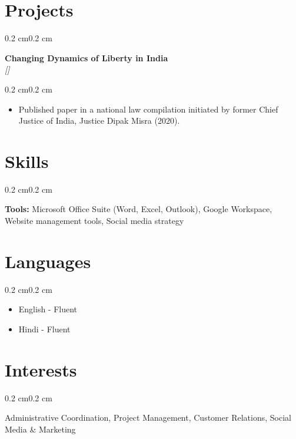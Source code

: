 \documentclass[10pt, letterpaper]{article}
\newenvironment{highlights}{%
    \begin{itemize}[
        topsep=0.10 cm,%
        parsep=0.10 cm,%
        partopsep=0pt,%
        itemsep=0pt,%
        leftmargin=0.4 cm + 10pt%
    ]
}{%
    \end{itemize}%
}
\newenvironment{onecolentry}{%
    \begin{adjustwidth}{0.2 cm}{0.2 cm}%
}{%
    \end{adjustwidth}%
}
\newenvironment{twocolentry}[1]{%
    \begin{onecolentry}%
    \def\twocolentryarg{#1}%
    \noindent
    \begin{minipage}[t]{0.68\textwidth} %
}{%
    \end{minipage}\hfill%
    \begin{minipage}[t]{0.30\textwidth} %
      \raggedleft\twocolentryarg
    \end{minipage}%
    \vspace{0.2cm}%
    \end{onecolentry}%
}
\let\hrefWithoutArrow\href
\renewcommand{\href}[2]{%
  \hrefWithoutArrow{#1}{%
    \ifthenelse{\equal{#2}{}}{ }{#2 }\raisebox{.15ex}{\footnotesize \faExternalLink*}%
  }%
}
\begin{document}
\section{Projects}
\begin{twocolentry}{\textit{\href{None}{None}}}
    \textbf{Changing Dynamics of Liberty in India }\\
    \textit{[] }
\end{twocolentry}
\vspace{0.10 cm}
\begin{onecolentry}
    \begin{highlights}
        \item Published paper in a national law compilation initiated by former Chief Justice of India, Justice Dipak Misra (2020).

    \end{highlights}
\end{onecolentry}
\vspace{0.2 cm}

\section{Skills}
\begin{onecolentry}
    \textbf{Tools:} Microsoft Office Suite (Word, Excel, Outlook), Google Workspace, Website management tools, Social media strategy\\
\end{onecolentry}


\section{Languages}
\begin{onecolentry}
    \begin{highlights}
        \item English - Fluent
        \item Hindi - Fluent
    \end{highlights}
\end{onecolentry}

\section{Interests}
\begin{onecolentry}
    Administrative Coordination, Project Management, Customer Relations, Social Media \& Marketing
\end{onecolentry}
\end{document}

